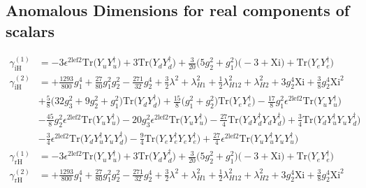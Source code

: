\subsection{Anomalous Dimensions for real components of scalars}
{\allowdisplaybreaks \begin{align} 
\gamma_{\text{iH}}^{(1)} & =  
-3 \epsilon^{{2 \text{lef2}}} \mbox{Tr}\Big({Y_u  Y_{u}^{\dagger}}\Big)  + 3 \mbox{Tr}\Big({Y_d  Y_{d}^{\dagger}}\Big)  + \frac{3}{20} \Big(5 g_{2}^{2}  + g_{1}^{2}\Big)\Big(-3 + \text{Xi}\Big) + \mbox{Tr}\Big({Y_e  Y_{e}^{\dagger}}\Big)\\ 
\gamma_{\text{iH}}^{(2)} & =  
+\frac{1293}{800} g_{1}^{4} +\frac{27}{80} g_{1}^{2} g_{2}^{2} -\frac{271}{32} g_{2}^{4} +\frac{3}{2} \lambda^{2} +\lambda_{H1}^{2}+\frac{1}{2} \lambda_{H12}^{2} +\lambda_{H2}^{2}+3 g_{2}^{4} \text{Xi} +\frac{3}{8} g_{2}^{4} \text{Xi}^{2} \nonumber \\ 
 &+\frac{5}{8} \Big(32 g_{3}^{2}  + 9 g_{2}^{2}  + g_{1}^{2}\Big)\mbox{Tr}\Big({Y_d  Y_{d}^{\dagger}}\Big) +\frac{15}{8} \Big(g_{1}^{2} + g_{2}^{2}\Big)\mbox{Tr}\Big({Y_e  Y_{e}^{\dagger}}\Big) -\frac{17}{8} g_{1}^{2} \epsilon^{{2 \text{lef2}}} \mbox{Tr}\Big({Y_u  Y_{u}^{\dagger}}\Big) \nonumber \\ 
 &-\frac{45}{8} g_{2}^{2} \epsilon^{{2 \text{lef2}}} \mbox{Tr}\Big({Y_u  Y_{u}^{\dagger}}\Big) -20 g_{3}^{2} \epsilon^{{2 \text{lef2}}} \mbox{Tr}\Big({Y_u  Y_{u}^{\dagger}}\Big) -\frac{27}{4} \mbox{Tr}\Big({Y_d  Y_{d}^{\dagger}  Y_d  Y_{d}^{\dagger}}\Big) +\frac{3}{4} \mbox{Tr}\Big({Y_d  Y_{u}^{\dagger}  Y_u  Y_{d}^{\dagger}}\Big) \nonumber \\ 
 &-\frac{3}{4} \epsilon^{{2 \text{lef2}}} \mbox{Tr}\Big({Y_d  Y_{u}^{\dagger}  Y_u  Y_{d}^{\dagger}}\Big) -\frac{9}{4} \mbox{Tr}\Big({Y_e  Y_{e}^{\dagger}  Y_e  Y_{e}^{\dagger}}\Big) +\frac{27}{4} \epsilon^{{2 \text{lef2}}} \mbox{Tr}\Big({Y_u  Y_{u}^{\dagger}  Y_u  Y_{u}^{\dagger}}\Big) \\ 
\gamma_{\text{rH}}^{(1)} & =  
-3 \epsilon^{{2 \text{lef2}}} \mbox{Tr}\Big({Y_u  Y_{u}^{\dagger}}\Big)  + 3 \mbox{Tr}\Big({Y_d  Y_{d}^{\dagger}}\Big)  + \frac{3}{20} \Big(5 g_{2}^{2}  + g_{1}^{2}\Big)\Big(-3 + \text{Xi}\Big) + \mbox{Tr}\Big({Y_e  Y_{e}^{\dagger}}\Big)\\ 
\gamma_{\text{rH}}^{(2)} & =  
+\frac{1293}{800} g_{1}^{4} +\frac{27}{80} g_{1}^{2} g_{2}^{2} -\frac{271}{32} g_{2}^{4} +\frac{3}{2} \lambda^{2} +\lambda_{H1}^{2}+\frac{1}{2} \lambda_{H12}^{2} +\lambda_{H2}^{2}+3 g_{2}^{4} \text{Xi} +\frac{3}{8} g_{2}^{4} \text{Xi}^{2} \nonumber \\ 

\end{align}}
